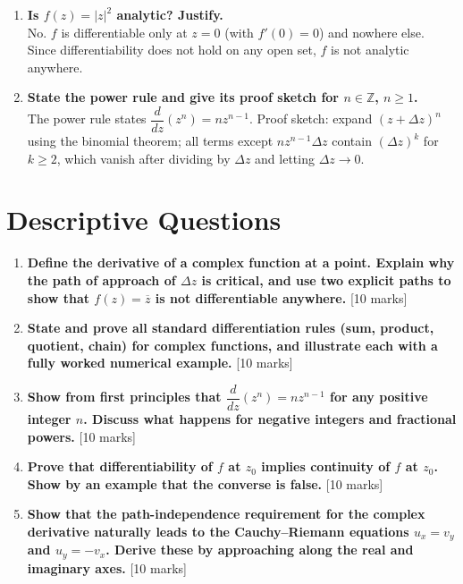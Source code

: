 \documentclass[12pt,a4paper]{article}
\begin{document}
\begin{enumerate}[label=\textbf{Q\arabic*.}, leftmargin=2.5em]
\item \textbf{Is $f(z) = |z|^2$ analytic? Justify.}\\
No. $f$ is differentiable only at $z=0$ (with $f'(0)=0$) and nowhere else.
Since differentiability does not hold on any open set, $f$ is not analytic anywhere.

\item \textbf{State the power rule and give its proof sketch for $n \in \mathbb{Z}$, $n \geq 1$.}\\
The power rule states $\dfrac{d}{dz}(z^n) = nz^{n-1}$.
Proof sketch: expand $(z+\Delta z)^n$ using the binomial theorem;
all terms except $nz^{n-1}\Delta z$ contain $(\Delta z)^k$ for $k\geq 2$,
which vanish after dividing by $\Delta z$ and letting $\Delta z \to 0$.

\end{enumerate}

\section{Descriptive Questions}

\begin{enumerate}[label=\textbf{D\arabic*.}, leftmargin=2.5em]

\item \textbf{Define the derivative of a complex function at a point. Explain why the path
      of approach of $\Delta z$ is critical, and use two explicit paths to show that
      $f(z)=\overline{z}$ is not differentiable anywhere.} \hfill[10 marks]

\item \textbf{State and prove all standard differentiation rules (sum, product, quotient, chain)
      for complex functions, and illustrate each with a fully worked numerical example.}
      \hfill[10 marks]

\item \textbf{Show from first principles that $\dfrac{d}{dz}(z^n) = nz^{n-1}$ for any positive
      integer $n$. Discuss what happens for negative integers and fractional powers.}
      \hfill[10 marks]

\item \textbf{Prove that differentiability of $f$ at $z_0$ implies continuity of $f$ at $z_0$.
      Show by an example that the converse is false.} \hfill[10 marks]

\item \textbf{Show that the path-independence requirement for the complex derivative naturally
      leads to the Cauchy--Riemann equations $u_x = v_y$ and $u_y = -v_x$.
      Derive these by approaching along the real and imaginary axes.} \hfill[10 marks]

\end{enumerate}
\end{document}
